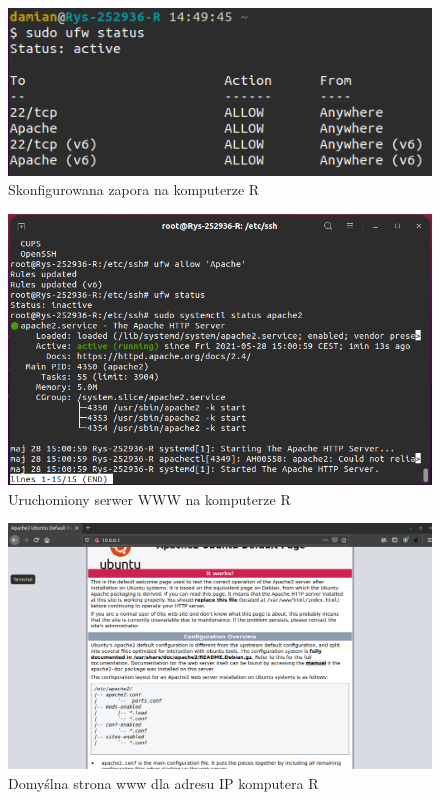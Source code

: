 \documentclass{article}
\begin{document}
\begin{figure}[H]
    \centering
    \includegraphics[totalheight=4cm]{6.WWW/2yeHK9Z.png}  
    \caption{Skonfigurowana zapora na komputerze R}
    \label{2}
\end{figure}



\begin{figure}[H]
    \centering
    \includegraphics[totalheight=6cm]{6.WWW/VirtualBoxVM_6Um6MFTiwV.png}  
    \caption{Uruchomiony serwer WWW na komputerze R}
    \label{2}
\end{figure}

\newpage
\begin{figure}[H]
    \centering
    \includegraphics[totalheight=6cm]{6.WWW/VirtualBoxVM_epWXKYFWp9.png}  
    \caption{Domyślna strona www dla adresu IP komputera R}
    \label{2}
\end{figure}
\end{document}
